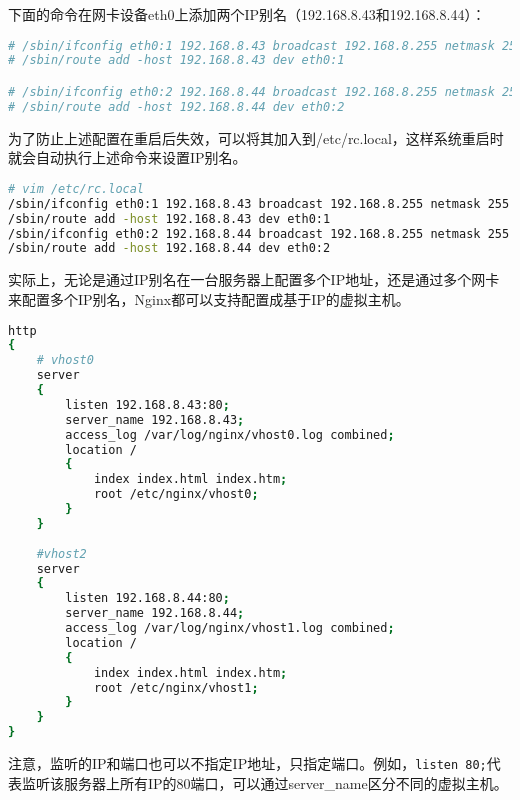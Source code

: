下面的命令在网卡设备eth0上添加两个IP别名（192.168.8.43和192.168.8.44）：


\begin{lstlisting}[language=bash]
# /sbin/ifconfig eth0:1 192.168.8.43 broadcast 192.168.8.255 netmask 255.255.255.0 up
# /sbin/route add -host 192.168.8.43 dev eth0:1

# /sbin/ifconfig eth0:2 192.168.8.44 broadcast 192.168.8.255 netmask 255.255.255.0 up
# /sbin/route add -host 192.168.8.44 dev eth0:2
\end{lstlisting}

为了防止上述配置在重启后失效，可以将其加入到/etc/rc.local，这样系统重启时就会自动执行上述命令来设置IP别名。



\begin{lstlisting}[language=bash]
# vim /etc/rc.local
/sbin/ifconfig eth0:1 192.168.8.43 broadcast 192.168.8.255 netmask 255.255.255.0 up
/sbin/route add -host 192.168.8.43 dev eth0:1
/sbin/ifconfig eth0:2 192.168.8.44 broadcast 192.168.8.255 netmask 255.255.255.0 up
/sbin/route add -host 192.168.8.44 dev eth0:2
\end{lstlisting}

实际上，无论是通过IP别名在一台服务器上配置多个IP地址，还是通过多个网卡来配置多个IP别名，Nginx都可以支持配置成基于IP的虚拟主机。




\begin{lstlisting}[language=bash]
http
{
	# vhost0
	server
	{
		listen 192.168.8.43:80;
		server_name 192.168.8.43;
		access_log /var/log/nginx/vhost0.log combined;
		location /
		{
			index index.html index.htm;
			root /etc/nginx/vhost0;
		}
	}
	
	#vhost2
	server
	{
		listen 192.168.8.44:80;
		server_name 192.168.8.44;
		access_log /var/log/nginx/vhost1.log combined;
		location /
		{
			index index.html index.htm;
			root /etc/nginx/vhost1;
		}
	}
}
\end{lstlisting}

注意，监听的IP和端口也可以不指定IP地址，只指定端口。例如，\texttt{listen 80;}代表监听该服务器上所有IP的80端口，可以通过server\_name区分不同的虚拟主机。


\begin{lstlisting}[language=bash]

\end{lstlisting}




\begin{lstlisting}[language=bash]

\end{lstlisting}





